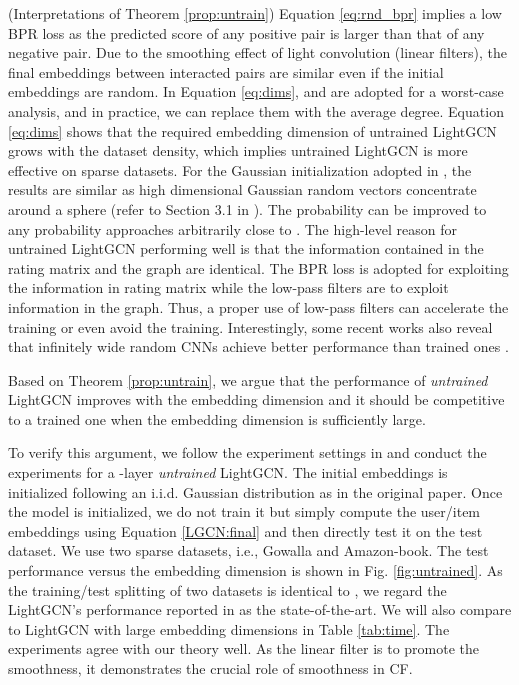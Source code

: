 \documentclass[sigconf]{acmart}
\begin{document}
\begin{remark} (Interpretations of Theorem \ref{prop:untrain}) Equation \eqref{eq:rnd_bpr} implies a low BPR loss as the predicted score of any positive pair is larger than that of any negative pair. Due to the smoothing effect of light convolution (linear filters), the final embeddings between interacted pairs are similar even if the initial embeddings are random. In Equation \eqref{eq:dims},  and  are adopted for a worst-case analysis, and in practice, we can replace them with the average degree. Equation \eqref{eq:dims} shows that the required embedding dimension of untrained LightGCN grows with the dataset density, which implies untrained LightGCN is more effective on sparse datasets. For the Gaussian initialization adopted in \cite{he2020lightgcn}, the results are similar as high dimensional Gaussian random vectors concentrate around a sphere (refer to Section 3.1 in \cite{vershynin2018high}). The probability  can be improved to any probability approaches arbitrarily close to . The high-level reason for untrained LightGCN performing well is that the information contained in the rating matrix and the graph are identical. The BPR loss is adopted for exploiting the information in rating matrix while the low-pass filters are to exploit information in the graph. Thus, a proper use of low-pass filters can accelerate the training or even avoid the training. Interestingly, some recent works also reveal that infinitely wide random CNNs achieve better performance than trained ones \cite{arora2019harnessing}.
\end{remark}

Based on Theorem \ref{prop:untrain}, we argue that the performance of \emph{untrained} LightGCN improves with the embedding dimension and it should be competitive to a trained one when the embedding dimension is sufficiently large. 

To verify this argument, we follow the experiment settings in \cite{he2020lightgcn} and conduct the experiments for a -layer \emph{untrained} LightGCN. The initial embeddings  is initialized following an i.i.d. Gaussian distribution  as in the original paper. Once the model is initialized, we do not train it but simply compute the user/item embeddings using Equation \eqref{LGCN:final} and then directly test it on the test dataset. We use two sparse datasets, i.e., Gowalla and Amazon-book. The test performance versus the embedding dimension is shown in Fig. \ref{fig:untrained}. As the training/test splitting of two datasets is identical to \cite{he2020lightgcn}, we regard the LightGCN's performance reported in \cite{he2020lightgcn} as the state-of-the-art. We will also compare to LightGCN with large embedding dimensions in Table \ref{tab:time}. The experiments agree with our theory well. As the linear filter is to promote the smoothness, it demonstrates the crucial role of smoothness in CF.
\end{document}
